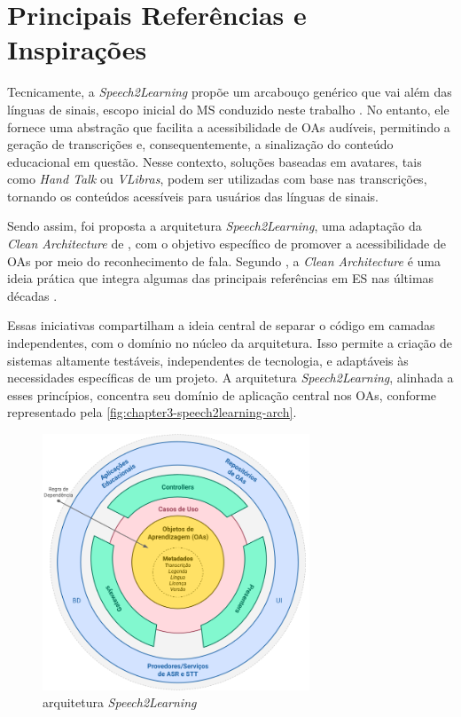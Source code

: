 \section{Principais Referências e Inspirações}

Tecnicamente, a \textit{Speech2Learning} propõe um arcabouço genérico que vai além das línguas de sinais, escopo inicial do MS conduzido neste trabalho \cite{FalvoJr2020_SBIE, FalvoJr2020_FIE, FalvoJr2021_RENOTE}. No entanto, ele fornece uma abstração que facilita a acessibilidade de OAs audíveis, permitindo a geração de transcrições e, consequentemente, a sinalização do conteúdo educacional em questão. Nesse contexto, soluções baseadas em avatares, tais como \textit{Hand Talk} ou \textit{VLibras}, podem ser utilizadas com base nas transcrições, tornando os conteúdos acessíveis para usuários das línguas de sinais.

Sendo assim, foi proposta a arquitetura \textit{Speech2Learning}, uma adaptação da \textit{Clean Architecture} de , com o objetivo específico de promover a acessibilidade de OAs por meio do reconhecimento de fala. Segundo , a \textit{Clean Architecture} é uma ideia prática que integra algumas das principais referências em ES nas últimas décadas \cite{cockburn2005, freeman2009, palermo2008, coplien2012, reenskaug2009, jacobson1992}. 

Essas iniciativas compartilham a ideia central de separar o código em camadas independentes, com o domínio no núcleo da arquitetura. Isso permite a criação de sistemas altamente testáveis, independentes de tecnologia, e adaptáveis às necessidades específicas de um projeto. A arquitetura \textit{Speech2Learning}, alinhada a esses princípios, concentra seu domínio de aplicação central nos OAs, conforme representado pela \autoref{fig:chapter3-speech2learning-arch}. 

\begin{figure}[htb]
\centering
\caption{arquitetura \textit{Speech2Learning}}
\label{fig:chapter3-speech2learning-arch}
\includegraphics[width=0.71\textwidth]{images/chapter3-speech2learning-arch.png}
\end{figure}

